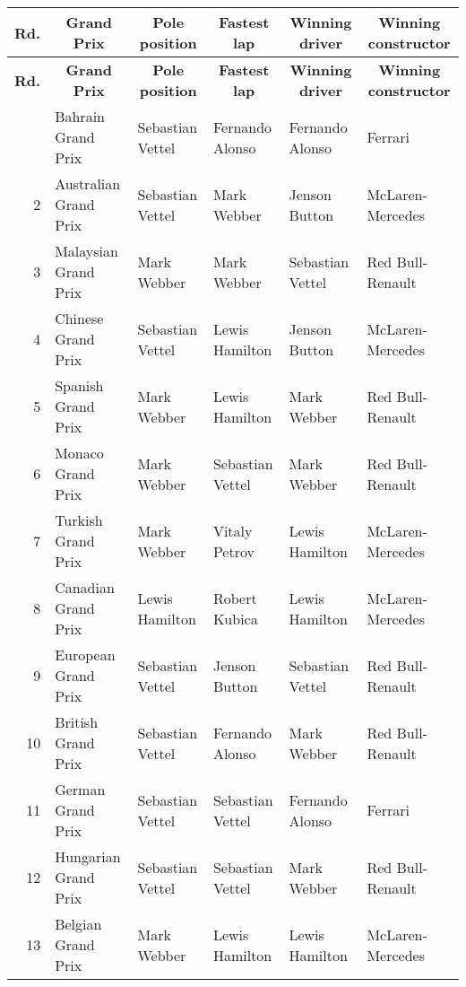 \documentclass[12pt]{article}
\begin{document}
\makeatletter
\renewcommand{\@oddhead}{\vbox{\hbox to\textwidth{\hfil \strut Grand Prix}\rule{\textwidth}{0.5pt}}}
\makeatother

\begin{longtable}{rlllll}
\hline
\multicolumn{1}{c}{\bfseries Rd.} & \multicolumn{1}{c}{\bfseries Grand Prix}
	& \multicolumn{1}{c}{\bfseries Pole position} & \multicolumn{1}{c}{\bfseries Fastest lap}
	& \multicolumn{1}{c}{\bfseries Winning driver} & \multicolumn{1}{c}{\bfseries Winning constructor} \\
\hline\endhead
\hline
\multicolumn{1}{c}{\bfseries Rd.} & \multicolumn{1}{c}{\bfseries Grand Prix}
	& \multicolumn{1}{c}{\bfseries Pole position} & \multicolumn{1}{c}{\bfseries Fastest lap}
	& \multicolumn{1}{c}{\bfseries Winning driver} & \multicolumn{1}{c}{\bfseries Winning constructor} \\
\hline\endfoot
 1 & Bahrain Grand Prix & Sebastian Vettel & Fernando Alonso & Fernando Alonso & Ferrari \\
 2 & Australian Grand Prix & Sebastian Vettel & Mark Webber & Jenson Button & McLaren-Mercedes \\
 3 & Malaysian Grand Prix & Mark Webber & Mark Webber & Sebastian Vettel & Red Bull-Renault \\
 4 & Chinese Grand Prix & Sebastian Vettel & Lewis Hamilton & Jenson Button & McLaren-Mercedes \\
 5 & Spanish Grand Prix & Mark Webber & Lewis Hamilton & Mark Webber & Red Bull-Renault \\
 6 & Monaco Grand Prix & Mark Webber & Sebastian Vettel & Mark Webber & Red Bull-Renault \\
 7 & Turkish Grand Prix & Mark Webber & Vitaly Petrov & Lewis Hamilton & McLaren-Mercedes \\
 8 & Canadian Grand Prix & Lewis Hamilton & Robert Kubica & Lewis Hamilton & McLaren-Mercedes \\
 9 & European Grand Prix & Sebastian Vettel & Jenson Button & Sebastian Vettel & Red Bull-Renault \\
10 & British Grand Prix & Sebastian Vettel & Fernando Alonso & Mark Webber & Red Bull-Renault \\
11 & German Grand Prix & Sebastian Vettel & Sebastian Vettel & Fernando Alonso & Ferrari \\
12 & Hungarian Grand Prix & Sebastian Vettel & Sebastian Vettel & Mark Webber & Red Bull-Renault \\
13 & Belgian Grand Prix & Mark Webber & Lewis Hamilton & Lewis Hamilton & McLaren-Mercedes \\

\end{longtable}
\end{document}
